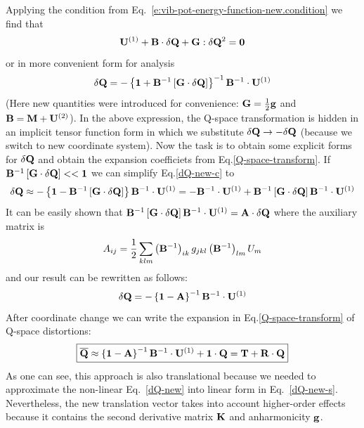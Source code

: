 \documentclass[a4paper,titlepage,twoside,fleqn,12pt]{book}
\begin{document}
\begin{refsection}
Applying the condition from Eq.~\eqref{e:vib-pot-energy-function-new.condition} we find that
%
\begin{equation}\label{dQ-new}
{\bf U}^{(1)} + {\bf B} \cdot \delta {\bf Q} + {\bf G} : \delta{\bf Q}^2 = {\bf 0}
\end{equation}
%
or in more convenient form for analysis
%
\begin{equation}\label{dQ-new-c}
\delta {\bf Q} = 
-\left\{ 
       {\bf 1} + {\bf B}^{-1} \left[ {\bf G} \cdot \delta {\bf Q} \right]
\right\}^{-1} {\bf B}^{-1} \cdot {\bf U}^{(1)}
\end{equation}
%
(Here new quantities were introduced for convenience: ${\bf G} = \frac{1}{2} {\bf g}$
and ${\bf B} = {\bf M} + {\bf U}^{(2)}$). 
In the above expression, the Q-space transformation is hidden in an implicit tensor
function form in which we substitute $\delta {\bf Q}\rightarrow -\delta {\bf Q}$
(because we switch to new coordinate system).
Now the task is to obtain some explicit forms for $\delta {\bf Q}$ and
obtain the expansion coefficiets from Eq.\eqref{Q-space-transform}.
%
If~${\bf B}^{-1} \left[ {\bf G} \cdot \delta {\bf Q} \right] << {\bf 1} $ 
we can simplify Eq.\eqref{dQ-new-c} to
%
\begin{equation}\label{dQ-new-s}
\delta {\bf Q} \approx
-\left\{ 
       {\bf 1} - {\bf B}^{-1} \left[ {\bf G} \cdot \delta {\bf Q} \right]
\right\} {\bf B}^{-1} \cdot {\bf U}^{(1)} = 
%
- {\bf B}^{-1} \cdot {\bf U}^{(1)} + {\bf B}^{-1} \left[ {\bf G} \cdot \delta {\bf Q} \right] {\bf B}^{-1} \cdot {\bf U}^{(1)}
\end{equation}
%
It can be easily shown that 
${\bf B}^{-1} \left[ {\bf G} \cdot \delta {\bf Q} \right] {\bf B}^{-1} \cdot {\bf U}^{(1)} = {\bf A} \cdot \delta {\bf Q}$
where the auxiliary matrix is
%
\begin{equation}\label{A}
A_{ij} = \frac{1}{2}\sum_{klm} 
   \left( {\bf B}^{-1} \right)_{ik} g_{jkl} \left( {\bf B}^{-1} \right)_{lm} 
U_m
\end{equation}
%
and our result can be rewritten as follows:
%
\begin{equation}\label{dQ-T1}
\delta {\bf Q} = -  \left\{ {\bf 1} - {\bf A} \right\}^{-1} {\bf B}^{-1} \cdot {\bf U}^{(1)}
\end{equation}
%
After coordinate change we can write the expansion in Eq.\eqref{Q-space-transform} 
of Q-space distortions:
\begin{equation}\label{Q-new-T1}
\boxed{
{\bf \overline{Q}} \approx  \left\{ {\bf 1} - {\bf A} \right\}^{-1} {\bf B}^{-1} \cdot {\bf U}^{(1)} + {\bf 1} \cdot {\bf Q}
= {\bf T} + {\bf R} \cdot {\bf Q}
}
\end{equation}
%
As one can see, this approach is also translational because 
we needed to approximate the non\hyp{}linear Eq.~\eqref{dQ-new} into
linear form in Eq.~\eqref{dQ-new-s}.
Nevertheless, the new translation vector takes into account
higher\hyp{}order effects because it contains the second derivative matrix $\bf K$
and anharmonicity $\bf g$.


\end{refsection}
\end{document}
